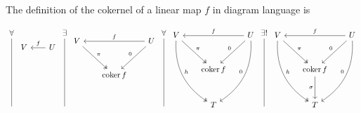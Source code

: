 \documentclass[12pt]{amsart}
\theoremstyle{definition}
\DeclareMathOperator{\coker}{\mathrm{coker}}
\begin{document}
\begin{enumerate}
The definition of the cokernel of a linear map $f$ in diagram language is

\[
    \begin{tikzcd}[row sep=1cm, column sep=.7cm]
     \forall\arrow[ddd, dash]\\
     \\
     \\
     \;
    \end{tikzcd} 
    \begin{tikzcd}[row sep=1cm, column sep=.65cm]
     V& U\arrow[l,"f"']\\
     &\\
     &
    \end{tikzcd}
    \begin{tikzcd}[row sep=1cm, column sep=.7cm]
     \exists\arrow[ddd, dash]\\
     \\
     \\
     \;
    \end{tikzcd} 
    \begin{tikzcd}[row sep=1cm, column sep=.65cm]
     V&& U\arrow[ll,"f"']\\
     &\coker f\arrow[ul, twoheadleftarrow, "\pi"']\arrow[ur, "0", leftarrow]&\\
     & & 
    \end{tikzcd}
    \begin{tikzcd}[row sep=1cm, column sep=.7cm]
     \forall\arrow[ddd, dash,]\\
     \\
     \\
     \;
    \end{tikzcd}
    \begin{tikzcd}[row sep=1cm, column sep=.65cm]
     V&& U\arrow[ll,"f"']\\
     &\coker f\arrow[ul, twoheadleftarrow, "\pi"']\arrow[ur, "0", leftarrow]&\\
     &T\arrow[uul, twoheadleftarrow, "h"', bend left]\arrow[uur, "0", leftarrow, bend right]&
    \end{tikzcd}
    \begin{tikzcd}[row sep=1cm, column sep=.7cm]
     \exists!\arrow[ddd, dash]\\
     \\
     \\
     \;
    \end{tikzcd}
    \begin{tikzcd}[row sep=1cm, column sep=.65cm]
     V&& U\arrow[ll,"f"']\\
     &\coker f\arrow[ul, twoheadleftarrow, "\pi"']\arrow[ur, "0", leftarrow]&\\
     &T\arrow[uul, twoheadleftarrow, "h"', bend left]\arrow[uur, "0", leftarrow, bend right]\arrow[u, leftarrow, "\sigma"]&
    \end{tikzcd}
    \]


\end{enumerate}
\end{document}
